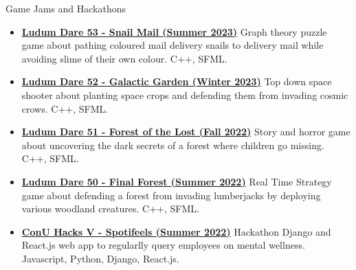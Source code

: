 \documentclass[]{mcdowellcv}
\begin{document}
	\begin{cvsection}{Game Jams and Hackathons}
		\begin{cvsubsection}{}{}{}	
			\begin{itemize}
                \item \textbf{\href{https://ldjam.com/events/ludum-dare/53/snail-mail-2}{Ludum Dare 53 - Snail Mail (Summer 2023)}} Graph theory puzzle game about pathing coloured mail delivery snails to delivery mail while avoiding slime of their own colour. C++, SFML.
				\item \textbf{\href{https://ldjam.com/events/ludum-dare/52/galactic-garden}{Ludum Dare 52 - Galactic Garden (Winter 2023)}} Top down space shooter about planting space crops and defending them from invading cosmic crows. C++, SFML.
				\item \textbf{\href{https://ldjam.com/events/ludum-dare/51/forest-of-the-lost}{Ludum Dare 51 - Forest of the Lost (Fall 2022)}} Story and horror game about uncovering the dark secrets of a forest where children go missing. C++, SFML.
				\item \textbf{\href{https://ldjam.com/events/ludum-dare/50/final-forest}{Ludum Dare 50 - Final Forest (Summer 2022)}} Real Time Strategy game about defending a forest from invading lumberjacks by deploying various woodland creatures. C++, SFML.
				\item \textbf{\href{https://github.com/Team-Blockchain-Ai-Machine-Learning/Spotifeels}{ConU Hacks V - Spotifeels (Summer 2022)}} Hackathon Django and React.js web app to regularlly query employees on mental wellness. Javascript, Python, Django, React.js.
			\end{itemize}
		\end{cvsubsection}
	\end{cvsection}
	
\end{document}
